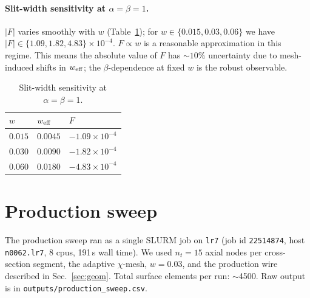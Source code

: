 \documentclass[11pt]{article}
\begin{document}
\paragraph{Slit-width sensitivity at $\alpha=\beta=1$.}
$|F|$ varies smoothly with $w$ (Table~\ref{tab:slit-sens}); for
$w\in\{0.015,0.03,0.06\}$ we have $|F|\in\{1.09,1.82,4.83\}\times 10^{-4}$.
$F\propto w$ is a reasonable approximation in this regime.  This means
the absolute value of $F$ has $\sim 10\%$ uncertainty due to mesh-induced
shifts in $w_{\rm eff}$; the $\beta$-dependence at fixed $w$ is the
robust observable.

\begin{table}[h]
\centering
\begin{tabular}{lll}\toprule
$w$ & $w_{\rm eff}$ & $F$ \\\midrule
$0.015$ & $0.0045$ & $-1.09\times 10^{-4}$ \\
$0.030$ & $0.0090$ & $-1.82\times 10^{-4}$ \\
$0.060$ & $0.0180$ & $-4.83\times 10^{-4}$ \\\bottomrule
\end{tabular}
\caption{Slit-width sensitivity at $\alpha=\beta=1$.}
\label{tab:slit-sens}
\end{table}

\section{Production sweep}
\label{sec:prod}

The production sweep ran as a single SLURM job on \texttt{lr7} (job id
\texttt{22514874}, host \texttt{n0062.lr7}, 8 cpus, 191\,s wall time).
We used $n_t=15$ axial nodes per cross-section segment, the adaptive
$\chi$-mesh, $w=0.03$, and the production wire described in
Sec.~\ref{sec:geom}.  Total surface elements per run: $\sim$4500.  Raw
output is in \texttt{outputs/production\_sweep.csv}.
\end{document}
